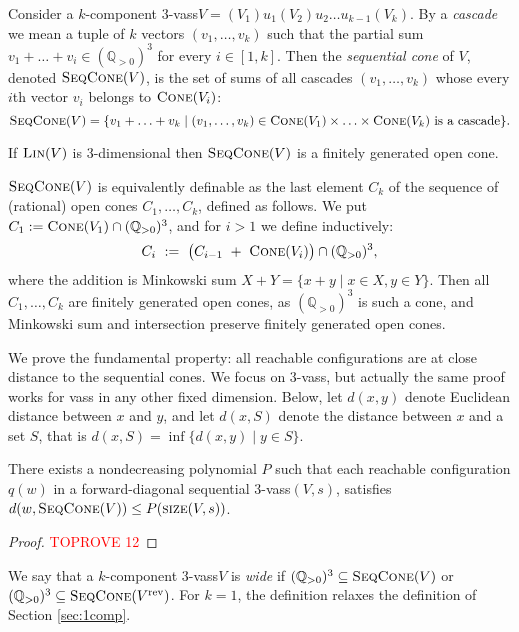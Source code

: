 \documentclass[a4paper, UKenglish, cleveref, autoref, thm-restate]{lipics-v2021}
\newcommand{\Q}{\mathbb{Q}}
\newcommand{\Qpos}{\Q_{>0}}
\newcommand{\set}[1]{\{#1\}}
\newcommand{\setof}[2]{\set{#1 \mid #2}}
\newcommand{\size}{\textsc{size}}
\newcommand{\Lin}[1]{\textsc{Lin}(#1)}
\newcommand{\vass}{{\sc vass}\xspace}
\newcommand{\tvass}{\parvass 3}
\newcommand{\parvass}[1]{{$#1$-\vass}\xspace}
\newcommand{\ktvass}{(V_1) u_1 (V_2) u_2 \ldots u_{k-1} (V_k)}
\newcommand{\setfromto}[2]{[#1, #2]}
\newcommand{\setto}[1]{\setfromto 1 {#1}}
\newcommand{\rev}[1]{{#1}^{\text{rev}}}
\newcommand{\cone}[1]{\textsc{Cone}(#1)}
\newcommand{\seqcone}[1]{\textsc{SeqCone}(#1)}
\begin{document}
Consider a $k$-component \tvass $V=\ktvass$.
By a \emph{cascade} we mean a tuple of $k$ vectors $(v_1, \ldots, v_k)$  
such that the partial sum $v_1 + \ldots + v_i \in (\Qpos)^3$ for every $i\in\setto k$.
Then the \emph{sequential cone} of $V$, denoted $\seqcone V$, is the set of 
sums of all cascades $(v_1, \ldots, v_k)$ 
whose every $i$th vector $v_i$ belongs to $\cone{V_i}$: 
\[
\seqcone V = \{v_1 + \ldots + v_k \mid (v_1, \ldots, v_k) \in \cone{V_1} \times \ldots \times \cone{V_k} 
\text{ is a cascade}\}.
\]
\vspace{-0.7cm}
\begin{claim} \label{claim:seqcone}
If $\Lin V$ is 3-dimensional then $\seqcone V$ is a finitely generated open cone.
\end{claim}
\begin{appendixproof}
$\seqcone V$ is equivalently definable as the last element $C_k$ of the sequence
of (rational) open cones $C_1, \ldots, C_k$, defined as follows.
We put $C_1 := \cone{V_1}\cap (\Qpos)^3$,
and for $i > 1$ we define inductively:
\[
C_{i} \ := \ \big(C_{i-1}\  + \ \cone{V_{i}}\big) \cap (\Qpos)^3,
\]
where the addition is Minkowski sum $X+Y = \setof{x+y}{x\in X, y\in Y}$.
Then all $C_1, \ldots, C_k$ are finitely generated open cones, as $(\Qpos)^3$ is such
a cone,  
and Minkowski sum and intersection preserve finitely generated open cones.
\end{appendixproof}
We prove the fundamental property:
all reachable configurations are at close distance to the sequential cones.
We focus on \tvass, but actually the same proof works for \vass in any other fixed dimension.
Below, let $d(x,y)$ denote Euclidean distance between $x$ and $y$, and let $d(x,S)$ denote 
the distance between $x$ and a set $S$, that is $d(x,S) = \inf \setof{d(x,y)}{y \in S}$. 
\begin{lemma}\label{lem:not_far_from_cone}
There exists a nondecreasing polynomial $P$ such that 
each reachable configuration $q(w)$
in a forward-diagonal sequential \tvass $(V,s)$,  satisfies
$d(w, \seqcone V) \leq P(\size(V,s))$.
\end{lemma}

\begin{proof}\textcolor{red}{TOPROVE 12}\end{proof}
We say that a $k$-component \tvass $V$ is \emph{wide} if $(\Qpos)^3 \subseteq \seqcone V$
or $(\Qpos)^3 \subseteq \seqcone {\rev V}$.
For $k=1$, the definition relaxes the definition of Section \ref{sec:1comp}. 
\end{document}
